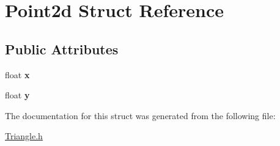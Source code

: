 \hypertarget{struct_point2d}{\section{Point2d Struct Reference}
\label{struct_point2d}
}
\subsection*{Public Attributes}
\begin{DoxyCompactItemize}
\item 
\hypertarget{struct_point2d_a0e2cdd233fb0c476aa03d7faafd8e4bd}{float {\bfseries x}}\label{struct_point2d_a0e2cdd233fb0c476aa03d7faafd8e4bd}

\item 
\hypertarget{struct_point2d_a1ec805cd00047d1e6251167dd55bf2ad}{float {\bfseries y}}\label{struct_point2d_a1ec805cd00047d1e6251167dd55bf2ad}

\end{DoxyCompactItemize}


The documentation for this struct was generated from the following file\-:\begin{DoxyCompactItemize}
\item 
\hyperlink{_triangle_8h}{Triangle.\-h}\end{DoxyCompactItemize}

